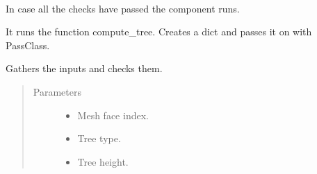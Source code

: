 \documentclass[letterpaper,10pt,english]{sphinxmanual}
\begin{document}
\begin{fulllineitems}

\begin{fulllineitems}
\label{\detokenize{cmf:livestock.components.comp_cmf.CMFSyntheticTree.run}}~
\begin{DUlineblock}{0em}
\item[] In case all the checks have passed the component runs.
\item[] It runs the function compute\_tree. Creates a dict and passes it on with PassClass.
\end{DUlineblock}

\end{fulllineitems}


\begin{fulllineitems}
\label{\detokenize{cmf:livestock.components.comp_cmf.CMFSyntheticTree.run_checks}}
Gathers the inputs and checks them.
\begin{quote}\begin{description}
\item[{Parameters}] \leavevmode\begin{itemize}
\item {} 
 \textendash{} Mesh face index.

\item {} 
 \textendash{} Tree type.

\item {} 
 \textendash{} Tree height.

\end{itemize}

\end{description}\end{quote}

\end{fulllineitems}


\end{fulllineitems}

\end{document}
